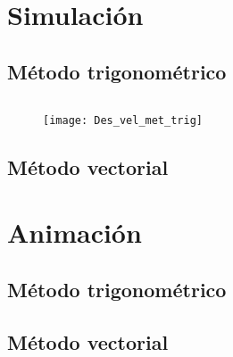 \documentclass[12pt, final]{extarticle}
\begin{document}
\newpage
\section{Simulación}
\subsection{Método trigonométrico}

{\small
\inputminted{matlab}{Codigos/ADA5_metodo_trig.m}}

\begin{figure}[ht]
    \centering
    \texttt{[image: Des\_vel\_met\_trig]}
\end{figure}

\newpage
\subsection{Método vectorial}


\newpage
\section{Animación}
\subsection{Método trigonométrico}

\subsection{Método vectorial}


\nocite{*}
\vfill


\end{document}
